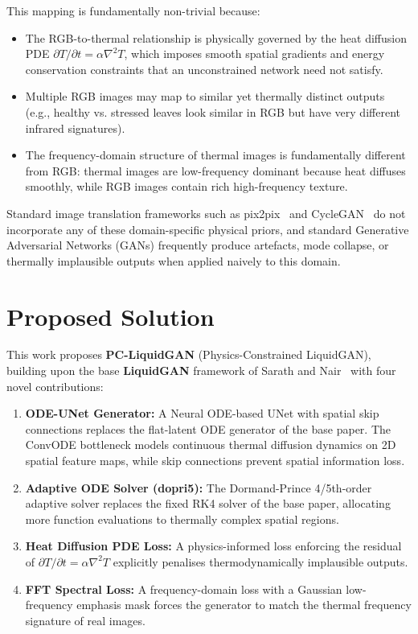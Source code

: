 This mapping is fundamentally non-trivial because:
\begin{itemize}
    \item The RGB-to-thermal relationship is physically governed by the heat diffusion PDE $\partial T/\partial t = \alpha \nabla^2 T$, which imposes smooth spatial gradients and energy conservation constraints that an unconstrained network need not satisfy.
    \item Multiple RGB images may map to similar yet thermally distinct outputs (e.g., healthy vs. stressed leaves look similar in RGB but have very different infrared signatures).
    \item The frequency-domain structure of thermal images is fundamentally different from RGB: thermal images are low-frequency dominant because heat diffuses smoothly, while RGB images contain rich high-frequency texture.
\end{itemize}

Standard image translation frameworks such as pix2pix~\cite{b_pix2pix} and CycleGAN~\cite{b_cyclegan} do not incorporate any of these domain-specific physical priors, and standard Generative Adversarial Networks (GANs) frequently produce artefacts, mode collapse, or thermally implausible outputs when applied naively to this domain.

\section{Proposed Solution}

This work proposes \textbf{PC-LiquidGAN} (Physics-Constrained LiquidGAN), building upon the base \textbf{LiquidGAN} framework of Sarath and Nair~\cite{b_liquidgan} with four novel contributions:

\begin{enumerate}
    \item \textbf{ODE-UNet Generator:} A Neural ODE-based UNet with spatial skip connections replaces the flat-latent ODE generator of the base paper. The ConvODE bottleneck models continuous thermal diffusion dynamics on 2D spatial feature maps, while skip connections prevent spatial information loss.
    \item \textbf{Adaptive ODE Solver (dopri5):} The Dormand-Prince 4/5th-order adaptive solver replaces the fixed RK4 solver of the base paper, allocating more function evaluations to thermally complex spatial regions.
    \item \textbf{Heat Diffusion PDE Loss:} A physics-informed loss enforcing the residual of $\partial T/\partial t = \alpha \nabla^2 T$ explicitly penalises thermodynamically implausible outputs.
    \item \textbf{FFT Spectral Loss:} A frequency-domain loss with a Gaussian low-frequency emphasis mask forces the generator to match the thermal frequency signature of real images.
\end{enumerate}

